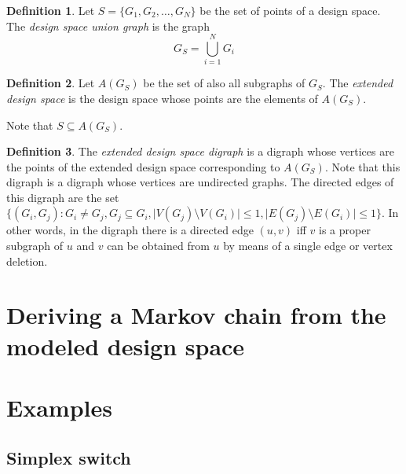 \documentclass[times,a4paper,10pt,twocolumn]{article}
\theoremstyle{definition}
\newtheorem{definition}{Definition}[section]
\theoremstyle{definition}
\theoremstyle{plain}
\begin{document}
\begin{definition}

Let $S = \{G_1, G_2, \ldots, G_N\}$ be the set of points of a design space. The
\emph{design space union graph} is the graph
\[
G_S = \bigcup \limits_{i = 1}^{N} G_i
\]

\end{definition}



\begin{definition}

Let $A(G_S)$ be the set of also all subgraphs of $G_S$. The \emph{extended
design space} is the design space whose points are the elements of $A(G_S)$.

\end{definition}

Note that $S \subseteq A(G_S)$.

\begin{definition}

The \emph{extended design space digraph} is a digraph whose vertices are the
points of the extended design space corresponding to $A(G_S)$. Note that this
digraph is a digraph whose vertices are undirected graphs. The directed edges
of this digraph are the set $\{(G_i, G_j) : G_i \neq G_j, G_j \subseteq G_i,
\lvert V(G_j) \setminus V(G_i) \rvert \leq 1, \lvert E(G_j) \setminus E(G_i)
\rvert \leq 1\}$. In other words, in the digraph there is a directed edge $(u,
v)$ iff $v$ is a proper subgraph of $u$ and $v$ can be obtained from $u$ by
means of a single edge or vertex deletion.

\end{definition}





\section{Deriving a Markov chain from the modeled design space}





\section{Examples}
\label{sec:Examples}


\subsection{Simplex switch}
\end{document}
